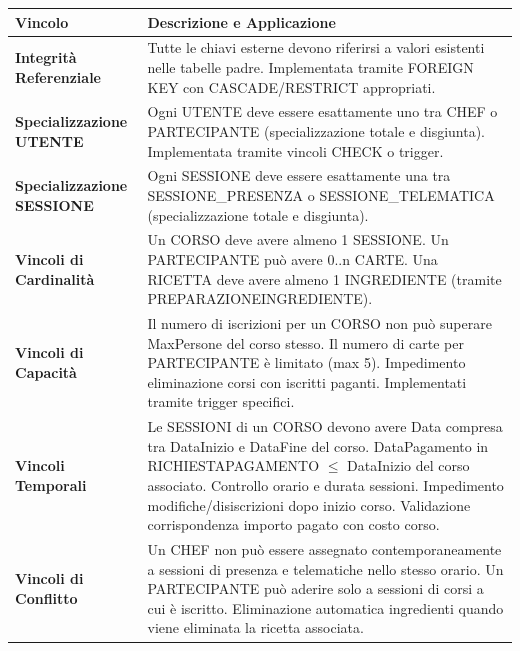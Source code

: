 \begin{center}
\begin{tcolorbox}[colback=white!98!gray, colframe=myblue!80!black, title=Vincoli Inter-relazionali, arc=4mm, boxrule=0.8pt, width=0.98\textwidth]
\renewcommand{\arraystretch}{1.2}
\begin{tabularx}{\textwidth}{p{4cm}X}
\textbf{Vincolo} & \textbf{Descrizione e Applicazione} \\
\hline
\textbf{Integrità Referenziale} & Tutte le chiavi esterne devono riferirsi a valori esistenti nelle tabelle padre. Implementata tramite FOREIGN KEY con CASCADE/RESTRICT appropriati. \\
\hline
\textbf{Specializzazione UTENTE} & Ogni UTENTE deve essere esattamente uno tra CHEF o PARTECIPANTE (specializzazione totale e disgiunta). Implementata tramite vincoli CHECK o trigger. \\
\hline
\textbf{Specializzazione SESSIONE} & Ogni SESSIONE deve essere esattamente una tra SESSIONE\_PRESENZA o SESSIONE\_TELEMATICA (specializzazione totale e disgiunta). \\
\hline
\textbf{Vincoli di Cardinalità} & Un CORSO deve avere almeno 1 SESSIONE. Un PARTECIPANTE può avere 0..n CARTE. Una RICETTA deve avere almeno 1 INGREDIENTE (tramite PREPARAZIONEINGREDIENTE). \\
\hline
\textbf{Vincoli di Capacità} & Il numero di iscrizioni per un CORSO non può superare MaxPersone del corso stesso. Il numero di carte per PARTECIPANTE è limitato (max 5). Impedimento eliminazione corsi con iscritti paganti. Implementati tramite trigger specifici. \\
\hline
\textbf{Vincoli Temporali} & Le SESSIONI di un CORSO devono avere Data compresa tra DataInizio e DataFine del corso. DataPagamento in RICHIESTAPAGAMENTO $\leq$ DataInizio del corso associato. Controllo orario e durata sessioni. Impedimento modifiche/disiscrizioni dopo inizio corso. Validazione corrispondenza importo pagato con costo corso. \\
\hline
\textbf{Vincoli di Conflitto} & Un CHEF non può essere assegnato contemporaneamente a sessioni di presenza e telematiche nello stesso orario. Un PARTECIPANTE può aderire solo a sessioni di corsi a cui è iscritto. Eliminazione automatica ingredienti quando viene eliminata la ricetta associata. \\
\hline
\end{tabularx}
\end{tcolorbox}
\end{center}

